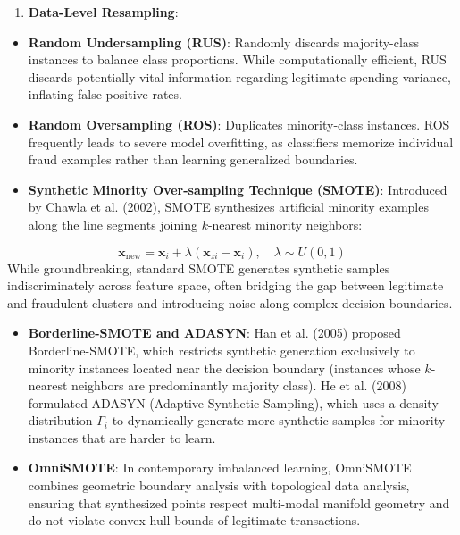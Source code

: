 \documentclass[12pt,a4paper,oneside]{report}
\begin{document}
\begin{enumerate}[leftmargin=0.35in]
\item \textbf{Data-Level Resampling}:
\end{enumerate}
\begin{itemize}[leftmargin=0.35in]
\item \textbf{Random Undersampling (RUS)}: Randomly discards majority-class instances to balance class proportions. While computationally efficient, RUS discards potentially vital information regarding legitimate spending variance, inflating false positive rates.
\item \textbf{Random Oversampling (ROS)}: Duplicates minority-class instances. ROS frequently leads to severe model overfitting, as classifiers memorize individual fraud examples rather than learning generalized boundaries.
\item \textbf{Synthetic Minority Over-sampling Technique (SMOTE)}: Introduced by Chawla et al. (2002), SMOTE synthesizes artificial minority examples along the line segments joining $k$-nearest minority neighbors:
\end{itemize}
\begin{equation}
\mathbf{x}_{\text{new}} = \mathbf{x}_i + \lambda (\mathbf{x}_{zi} - \mathbf{x}_i), \quad \lambda \sim U(0, 1)
\end{equation}
While groundbreaking, standard SMOTE generates synthetic samples indiscriminately across feature space, often bridging the gap between legitimate and fraudulent clusters and introducing noise along complex decision boundaries.

\begin{itemize}[leftmargin=0.35in]
\item \textbf{Borderline-SMOTE and ADASYN}: Han et al. (2005) proposed Borderline-SMOTE, which restricts synthetic generation exclusively to minority instances located near the decision boundary (instances whose $k$-nearest neighbors are predominantly majority class). He et al. (2008) formulated ADASYN (Adaptive Synthetic Sampling), which uses a density distribution $\Gamma_i$ to dynamically generate more synthetic samples for minority instances that are harder to learn.
\item \textbf{OmniSMOTE}: In contemporary imbalanced learning, OmniSMOTE combines geometric boundary analysis with topological data analysis, ensuring that synthesized points respect multi-modal manifold geometry and do not violate convex hull bounds of legitimate transactions.
\end{itemize}
\end{document}
